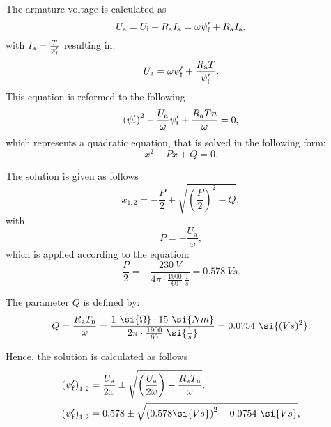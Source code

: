 \begin{solutionblock}
    The armature voltage is calculated as
    \begin{equation}
        U_{\mathrm{a}} = U_{\mathrm{i}} + R_{\mathrm{a}} I_{\mathrm{a}}
        = \omega \psi_{\mathrm{f}}' + R_{\mathrm{a}} I_{\mathrm{a}},
    \end{equation}
    with $I_{\mathrm{a}} = \frac{T}{\psi_{\mathrm{f}}'}$ resulting in:
    \begin{equation}
        U_{\mathrm{a}} = \omega \psi_{\mathrm{f}}' + \frac{R_{\mathrm{a}} T}{\psi_{\mathrm{f}}'}.
    \end{equation}
    This equation is reformed to the following
    \begin{equation}
        \left(\psi_{\mathrm{f}}' \right)^2 - \frac{U_{\mathrm{a}}}{\omega} \psi_{\mathrm{f}}' + \frac{R_{\mathrm{a}} Tn}{\omega} = 0,
    \end{equation}
    which represents a quadratic equation, that is solved in the following form:
    \begin{equation}
        x^2 + P x + Q = 0.
    \end{equation}

    The solution is given as follows
    \begin{equation}
        x_{\mathrm{1,2}} = -\frac{P}{2} \pm \sqrt{\left(\frac{P}{2}\right)^2 - Q},
    \end{equation}
    with 
    \begin{equation}
        P = -\frac{U_{\mathrm{a}}}{\omega},
    \end{equation}
    which is applied according to the equation:
    \begin{equation}
        \frac{P}{2} = - \frac{230 \ \si{V}}{4 \pi \cdot \frac{1900}{60} \ \si{\frac{1}{s}}}
        = 0.578 \ \si{Vs}.
    \end{equation}

    The parameter $Q$ is defined by:
    \begin{equation}
        Q = \frac{\Ra \Tn}{\omega}
        = \frac{1 \ \si{\Omega} \cdot 15 \ \si{Nm}}{2 \pi \cdot \frac{1900}{60} \ \si{\frac{1}{s}}}
        = 0.0754 \ \si{(Vs)^2}.
    \end{equation}


    Hence, the solution is calculated as follows
    \begin{align}
        \begin{split}
            \left(\psi_{\mathrm{f}}' \right)_{\mathrm{1,2}}
            &= \frac{U_{\mathrm{a}}}{2 \omega} \pm \sqrt{\left( \frac{U_{\mathrm{a}}}{2 \omega}\right) - \frac{\Ra \Tn}{\omega}}, \\
            \left(\psi_{\mathrm{f}}' \right)_{\mathrm{1,2}}
            &= 0.578 \pm \sqrt{\left(0.578 \si{Vs} \right)^2 - 0.0754 \ \si{Vs}},
        \end{split}
    \end{align}


\end{solutionblock}
